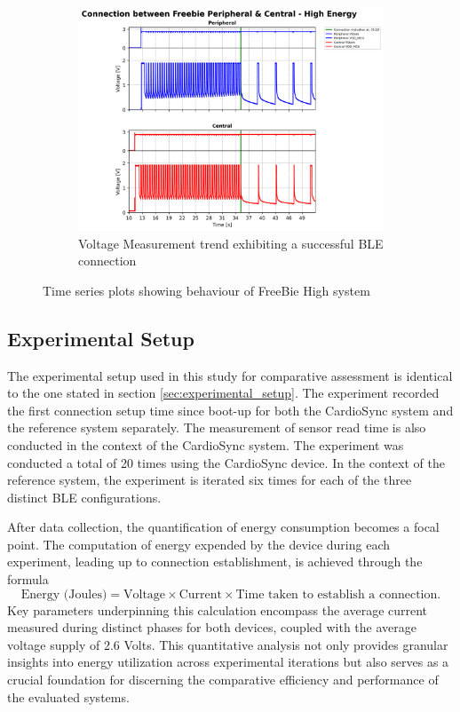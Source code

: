 \begin{figure}[H]
\begin{center}
\begin{subfigure}{0.5\linewidth}
            \includegraphics[width=\linewidth]{chapters/Results/Connection_Freebie_high.png}
            \caption{Voltage Measurement trend exhibiting a successful BLE connection}
            \label{fig:freebie_high_conn}
        \end{subfigure}    
    \end{center}
    \caption{\centering Time series plots showing behaviour of FreeBie High system}
\end{figure}

\subsection{Experimental Setup}
The experimental setup used in this study for comparative assessment is identical to the one stated in section \ref{sec:experimental_setup}. The experiment recorded the first connection setup time since boot-up for both the CardioSync system and the reference system separately. The measurement of sensor read time is also conducted in the context of the CardioSync system. The experiment was conducted a total of 20 times using the CardioSync device. In the context of the reference system, the experiment is iterated six times for each of the three distinct BLE configurations.

\noindent After data collection, the quantification of energy consumption becomes a focal point. The computation of energy expended by the device during each experiment, leading up to connection establishment, is achieved through the formula \[ \text{Energy (Joules)} = \text{Voltage} \times \text{Current} \times \text{Time taken to establish a connection}. \] Key parameters underpinning this calculation encompass the average current measured during distinct phases for both devices, coupled with the average voltage supply of 2.6 Volts. This quantitative analysis not only provides granular insights into energy utilization across experimental iterations but also serves as a crucial foundation for discerning the comparative efficiency and performance of the evaluated systems.


